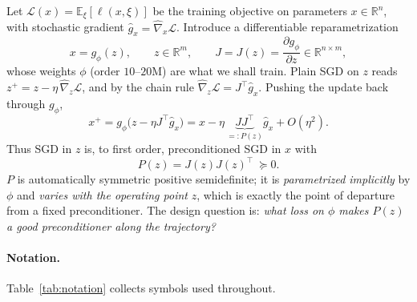 \documentclass[11pt]{article}
\theoremstyle{plain}
\theoremstyle{definition}
\theoremstyle{remark}
\newcommand{\R}{\mathbb{R}}
\newcommand{\E}{\mathbb{E}}
\newcommand{\Loss}{\mathcal{L}}
\begin{document}
Let $\Loss(x)=\E_\xi[\ell(x,\xi)]$ be the training objective on parameters $x\in\R^n$,
with stochastic gradient $\hat g_x=\hat\nabla_x\Loss$. Introduce a differentiable
reparametrization
\begin{equation}
  x = g_\phi(z), \qquad z\in\R^m,\qquad
  J = J(z) = \frac{\partial g_\phi}{\partial z}\in\R^{n\times m},
\end{equation}
whose weights $\phi$ (order $10$--$20$M) are what we shall train. Plain SGD on $z$ reads
$z^+ = z - \eta\,\hat\nabla_z\Loss$, and by the chain rule $\hat\nabla_z\Loss = J^{\!\top}\hat g_x$.
Pushing the update back through $g_\phi$,
\begin{equation}
\label{eq:implicit-precond}
  x^+ = g_\phi\!\big(z-\eta J^{\!\top}\hat g_x\big)
      = x - \eta\, \underbrace{JJ^{\!\top}}_{=:P(z)}\hat g_x + O(\eta^2).
\end{equation}
Thus SGD in $z$ is, to first order, preconditioned SGD in $x$ with
\begin{equation}
\label{eq:P}
  P(z) = J(z)J(z)^{\!\top}\ \succeq 0 .
\end{equation}
$P$ is automatically symmetric positive semidefinite; it is \emph{parametrized implicitly}
by $\phi$ and \emph{varies with the operating point} $z$, which is exactly the point of
departure from a fixed preconditioner. The design question is: \emph{what loss on $\phi$
makes $P(z)$ a good preconditioner along the trajectory?}

\paragraph{Notation.} Table~\ref{tab:notation} collects symbols used throughout.
\end{document}
